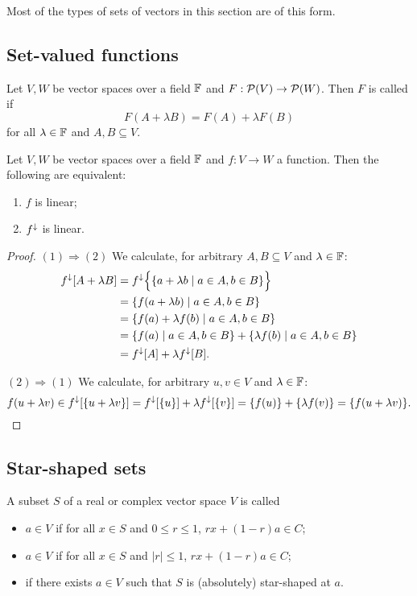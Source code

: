 Most of the types of sets of vectors in this section are of this form.



\subsection{Set-valued functions}
\begin{definition}
Let $V,W$ be vector spaces over a field $\mathbb{F}$ and $F: \operatorname{\mathcal{P}}(V)\to \operatorname{\mathcal{P}}(W)$. Then $F$ is called  if
\[ F(A+\lambda B) = F(A) + \lambda F(B) \]
for all $\lambda \in \mathbb{F}$ and $A,B\subseteq V$.
\end{definition}

\begin{lemma} \label{linearImageFunction}
Let $V,W$ be vector spaces over a field $\mathbb{F}$ and $f: V\to W$ a function. Then the following are equivalent:
\begin{enumerate}
\item $f$ is linear;
\item $f^\downarrow$ is linear.
\end{enumerate}
\end{lemma}
\begin{proof}
$(1) \Rightarrow (2)$ We calculate, for arbitrary $A,B\subseteq V$ and $\lambda\in \mathbb{F}$:
\begin{align*}
f^\imf[A+\lambda B] &= f^\imf\Big\{\setbuilder{a+\lambda b}{a\in A, b\in B}\Big\} \\
&= \setbuilder{f(a+\lambda b)}{a\in A, b\in B} \\
&= \setbuilder{f(a)+\lambda f(b)}{a\in A, b\in B} \\
&= \setbuilder{f(a)}{a\in A, b\in B} + \setbuilder{\lambda f(b)}{a\in A, b\in B} \\
&= f^\imf[A]+ \lambda f^\imf[B].
\end{align*}

$(2) \Rightarrow (1)$ We calculate, for arbitrary $u,v\in V$ and $\lambda\in \mathbb{F}$:
\[ f(u+\lambda v) \in f^\downarrow[\{u+\lambda v\}] = f^\downarrow[\{u\}] + \lambda f^\downarrow[\{v\}] = \{f(u)\} +\{\lambda f(v)\} = \{f(u+\lambda v)\}. \]
\end{proof}

\subsection{Star-shaped sets}
\begin{definition}
A subset $S$ of a real or complex vector space $V$ is called
\begin{itemize}
\item {} $a\in V$ if for all $x\in S$ and $0\leq r \leq 1$, $rx + (1-r)a\in C$;
\item {} $a\in V$ if for all $x\in S$ and $|r| \leq 1$, $rx + (1-r)a\in C$;
\item {} if there exists $a\in V$ such that $S$ is (absolutely) star-shaped at $a$.
\end{itemize}
\end{definition}

